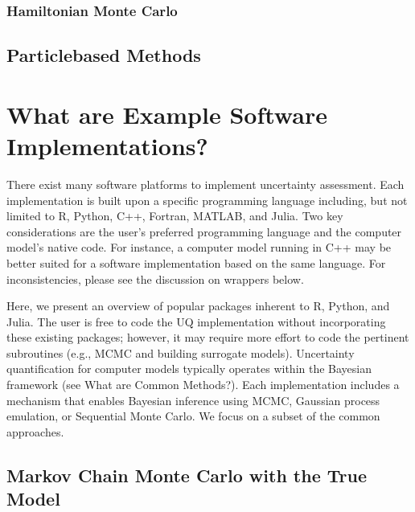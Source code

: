 \documentclass[letterpaper,10pt,english]{sphinxmanual}
\begin{document}
\subsubsection{Hamiltonian Monte Carlo}
\label{\detokenize{6_uncertainty_quantification_a_tool_for_capturing_risks_and_extremes:hamiltonian-monte-carlo}}

\subsection{Particle\sphinxhyphen{}based Methods}
\label{\detokenize{6_uncertainty_quantification_a_tool_for_capturing_risks_and_extremes:particle-based-methods}}

\section{What are Example Software Implementations?}
\label{\detokenize{6_uncertainty_quantification_a_tool_for_capturing_risks_and_extremes:what-are-example-software-implementations}}
\sphinxAtStartPar
There exist many software platforms to implement uncertainty assessment. Each implementation is built upon a specific programming language including, but not limited to R, Python, C++, Fortran, MATLAB, and Julia. Two key considerations are the user’s preferred programming language and the computer model’s native code. For instance, a computer model running in C++ may be better suited for a software implementation based on the same language. For inconsistencies, please see the discussion on wrappers below.

\sphinxAtStartPar
Here, we present an overview of popular packages inherent to R, Python, and Julia. The user is free to code the UQ implementation without incorporating these existing packages; however, it may require more effort to code the pertinent subroutines (e.g., MCMC and building surrogate models). Uncertainty quantification for computer models typically operates within the Bayesian framework (see What are Common Methods?). Each implementation includes a mechanism that enables Bayesian inference using MCMC, Gaussian process emulation, or Sequential Monte Carlo. We focus on a subset of the common approaches.


\subsection{Markov Chain Monte Carlo with the True Model}
\label{\detokenize{6_uncertainty_quantification_a_tool_for_capturing_risks_and_extremes:markov-chain-monte-carlo-with-the-true-model}}
\end{document}
